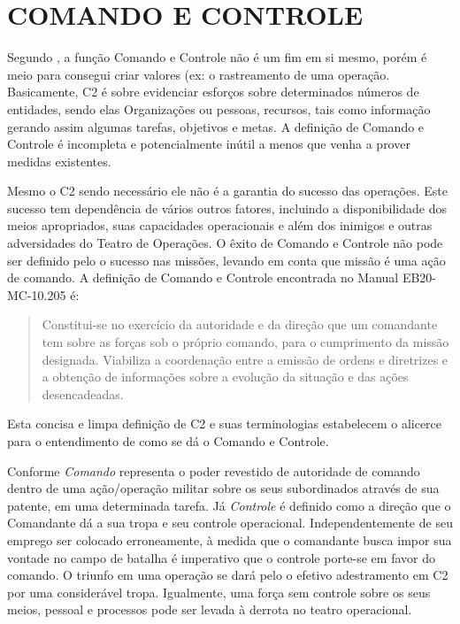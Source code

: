 \chapter{COMANDO E CONTROLE}

Segundo \cite{undestanding2006}, a função Comando e Controle não é um fim em si mesmo, porém é meio para consegui criar valores (ex: o rastreamento de uma operação. Basicamente, C2 é sobre evidenciar esforços sobre determinados números de entidades, sendo elas Organizações ou pessoas, recursos, tais como informação gerando assim algumas tarefas, objetivos e metas. A definição de Comando e Controle é  incompleta e potencialmente inútil a menos que venha a prover medidas existentes. 


Mesmo o C2 sendo necessário ele não é a garantia do sucesso das operações. Este sucesso tem dependência de vários outros fatores, incluindo a disponibilidade dos meios apropriados, suas capacidades operacionais e além dos inimigos e outras adversidades do Teatro de Operações. O êxito de Comando e Controle não pode ser definido pelo o sucesso nas missões, levando em conta que missão é uma ação de comando.
A definição de Comando e Controle encontrada no Manual EB20-MC-10.205 é:
\begin{quote}
 Constitui-se  no  exercício  da  autoridade  e  da  direção que um comandante tem sobre as forças sob o próprio comando, para o cumprimento da missão  designada.  Viabiliza  a  coordenação  entre  a  emissão  de  ordens  e  diretrizes  e  a  obtenção de informações sobre a evolução da situação e das ações desencadeadas. \cite{comandoecontrole2015}
\end{quote}
Esta concisa e limpa definição de C2 e suas terminologias estabelecem o alicerce para o entendimento de como se dá o Comando e Controle. 


Conforme  \cite{comandoecontrole2015} \textit{Comando} representa o poder revestido de autoridade de comando dentro de uma ação/operação militar sobre os seus subordinados através de sua patente, em uma determinada tarefa. Já \textit{Controle}  é definido como a direção que o Comandante dá a sua tropa e seu controle operacional. Independentemente de seu emprego ser colocado erroneamente, à medida que o comandante busca impor sua vontade no campo de batalha é imperativo que o controle porte-se em favor do comando. O triunfo em uma operação se dará pelo o efetivo adestramento em C2 por uma considerável tropa. Igualmente, uma força sem controle sobre os seus meios, pessoal e processos pode ser levada à derrota no teatro operacional. 


